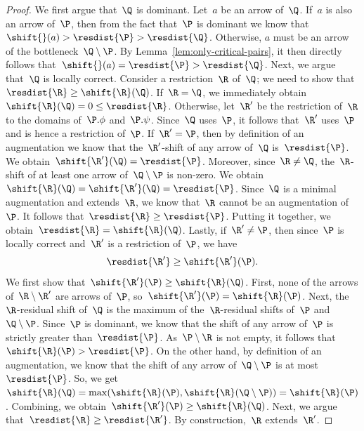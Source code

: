 \begin{proof}
    We first argue that~$\Q$ is dominant.
    Let~$a$ be an arrow of~$\Q$.
    If~$a$ is also an arrow of~$\P$, then from the fact that~$\P$ is dominant we know that~$\shift{}(a) > \resdist{\P} > \resdist{\Q}$.
    Otherwise, $a$ must be an arrow of the bottleneck~$\Q \setminus \P$.
    By Lemma~\ref{lem:only-critical-pairs}, it then directly follows that~$\shift{}(a) = \resdist{\P} > \resdist{\Q}$.
%
    Next, we argue that~$\Q$ is locally correct.
    Consider a restriction~$\R$ of~$\Q$; we need to show that~$\resdist{\R} \ge \shift{\R}(\Q)$.
    If~$\R = \Q$, we immediately obtain~$\shift{\R}(\Q) = 0 \le \resdist{\R}$.
    Otherwise, let~$\R'$ be the restriction of~$\R$ to the domains of~$\P.\phi$ and~$\P.\psi$.
    Since~$\Q$ uses~$\P$, it follows that~$\R'$ uses~$\P$ and is hence a restriction of~$\P$.
    If~$\R' = \P$, then by definition of an augmentation we know that the~$\R'$-shift of any arrow of~$\Q$ is~$\resdist{\P}$.
    We obtain~$\shift{\R'}(\Q) = \resdist{\P}$.
    Moreover, since~$\R \neq \Q$, the~$\R$-shift of at least one arrow of~$\Q \setminus \P$ is non-zero.
    We obtain~$\shift{\R}(\Q) = \shift{\R'}(\Q) = \resdist{\P}$.
    Since~$\Q$ is a minimal augmentation and extends~$\R$, we know that~$\R$ cannot be an augmentation of~$\P$.
    It follows that~$\resdist{\R} \ge \resdist{\P}$.
    Putting it together, we obtain~$\resdist{\R} = \shift{\R}(\Q)$.
%
    Lastly, if~$\R' \neq \P$, then since~$\P$ is locally correct and~$\R'$ is a restriction of~$\P$, we have
    \begin{equation}\label{eq:helper}
        \resdist{\R'} \ge \shift{\R'}(\P).
    \end{equation}
    We first show that~$\shift{\R'}(\P) \ge \shift{\R}(\Q)$.
    First, none of the arrows of~$\R \setminus \R'$ are arrows of~$\P$, so~$\shift{\R'}(\P) = \shift{\R}(\P)$.
    Next, the~$\R$-residual shift of~$\Q$ is the maximum of the~$\R$-residual shifts of~$\P$ and~$\Q \setminus \P$.
    Since~$\P$ is dominant, we know that the shift of any arrow of~$\P$ is strictly greater than~$\resdist{\P}$.
    As~$\P \setminus \R$ is not empty, it follows that~$\shift{\R}(\P) > \resdist{\P}$.
    On the other hand, by definition of an augmentation, we know that the shift of any arrow of~$\Q \setminus \P$ is at most~$\resdist{\P}$.
    So, we get~$\shift{\R}(\Q) = \max(\shift{\R}(\P), \shift{\R}(\Q \setminus \P)) = \shift{\R}(\P)$.
    Combining, we obtain~$\shift{\R'}(\P) \ge \shift{\R}(\Q)$.
%
    Next, we argue that~$\resdist{\R} \ge \resdist{\R'}$.
    By construction,~$\R$ extends~$\R'$.

\end{proof}
